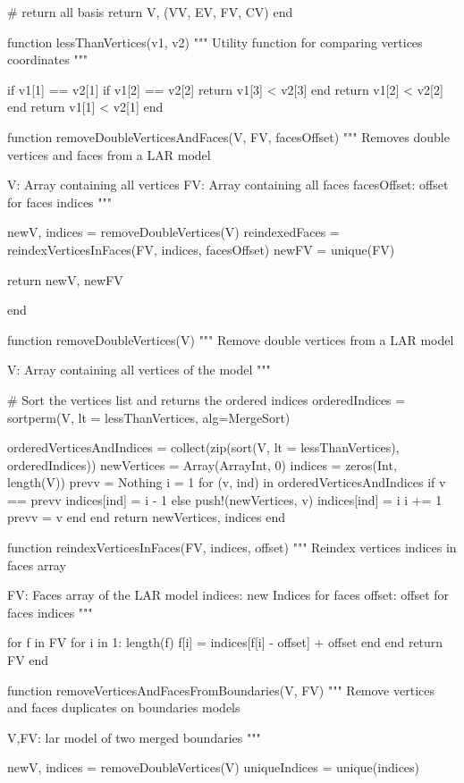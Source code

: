 \documentclass[11pt,oneside]{article}	%
\begin{document}
{  # return all basis
  return V, (VV, EV, FV, CV)
end

function lessThanVertices(v1, v2)
  """
  Utility function for comparing vertices coordinates
  """

  if v1[1] == v2[1]
    if v1[2] == v2[2]
      return v1[3] < v2[3]
    end
    return v1[2] < v2[2]
  end
  return v1[1] < v2[1]
end

function removeDoubleVerticesAndFaces(V, FV, facesOffset)
  """
  Removes double vertices and faces from a LAR model

  V: Array containing all vertices
  FV: Array containing all faces
  facesOffset: offset for faces indices
  """

  newV, indices = removeDoubleVertices(V)
  reindexedFaces = reindexVerticesInFaces(FV, indices, facesOffset)
  newFV = unique(FV)

  return newV, newFV

end

function removeDoubleVertices(V)
  """
  Remove double vertices from a LAR model

  V: Array containing all vertices of the model
  """

  # Sort the vertices list and returns the ordered indices
  orderedIndices = sortperm(V, lt = lessThanVertices, alg=MergeSort)

  orderedVerticesAndIndices = collect(zip(sort(V, lt = lessThanVertices),
                                          orderedIndices))
  newVertices = Array(Array{Int}, 0)
  indices = zeros(Int, length(V))
  prevv = Nothing
  i = 1
  for (v, ind) in orderedVerticesAndIndices
    if v == prevv
      indices[ind] = i - 1
    else
      push!(newVertices, v)
      indices[ind] = i
      i += 1
      prevv = v
    end
  end
  return newVertices, indices
end

function reindexVerticesInFaces(FV, indices, offset)
  """
  Reindex vertices indices in faces array

  FV: Faces array of the LAR model
  indices: new Indices for faces
  offset: offset for faces indices
  """

  for f in FV
    for i in 1: length(f)
      f[i] = indices[f[i] - offset] + offset
    end
  end
  return FV
end

function removeVerticesAndFacesFromBoundaries(V, FV)
  """
  Remove vertices and faces duplicates on
  boundaries models

  V,FV: lar model of two merged boundaries
  """

  newV, indices = removeDoubleVertices(V)
  uniqueIndices = unique(indices)

}
\end{document}
